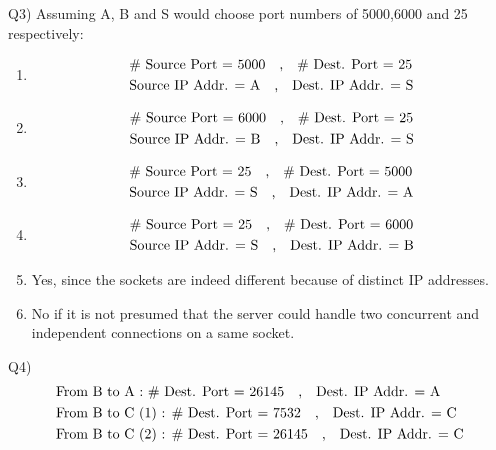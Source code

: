 \documentclass[10pt,letterpaper]{article}
\begin{document}
Q3) Assuming A, B and S would choose port numbers of 5000,6000 and 25 respectively:
\begin{enumerate}[label=\alph*-]
\item
\[
\begin{split}
&\text{
\# Source Port = 5000\quad,\quad \# Dest. Port = 25
}
\\&\text{
Source IP Addr. = A\quad,\quad Dest. IP Addr. = S
}
\end{split}
\]
\item
\[
\begin{split}
&\text{
\# Source Port = 6000\quad,\quad \# Dest. Port = 25
}
\\&\text{
Source IP Addr. = B\quad,\quad Dest. IP Addr. = S
}
\end{split}
\]
\item
\[
\begin{split}
&\text{
\# Source Port = 25\quad,\quad \# Dest. Port = 5000
}
\\&\text{
Source IP Addr. = S\quad,\quad Dest. IP Addr. = A
}
\end{split}
\]
\item
\[
\begin{split}
&\text{
\# Source Port = 25\quad,\quad \# Dest. Port = 6000
}
\\&\text{
Source IP Addr. = S\quad,\quad Dest. IP Addr. = B
}
\end{split}
\]
\item
Yes, since the sockets are indeed different because of distinct IP addresses.
\item
No if it is not presumed that the server could handle two concurrent and independent connections on a same socket.
\end{enumerate}

Q4)
\[
\begin{split}
&\text{
From B to A : \# Dest. Port = 26145\quad,\quad Dest. IP Addr. = A
}
\\&\text{
From B to C (1) : \# Dest. Port = 7532\quad,\quad Dest. IP Addr. = C
}
\\&\text{
From B to C (2) : \# Dest. Port = 26145\quad,\quad Dest. IP Addr. = C
}
\end{split}
\]
\end{document}
